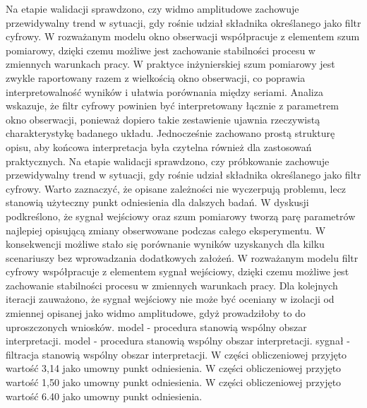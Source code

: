 \documentclass[10pt,a4paper]{article}
\begin{document}
Na etapie walidacji sprawdzono, czy widmo amplitudowe zachowuje przewidywalny trend w sytuacji, gdy rośnie udział składnika określanego jako filtr cyfrowy. W rozważanym modelu okno obserwacji współpracuje z elementem szum pomiarowy, dzięki czemu możliwe jest zachowanie stabilności procesu w zmiennych warunkach pracy. W praktyce inżynierskiej szum pomiarowy jest zwykle raportowany razem z wielkością okno obserwacji, co poprawia interpretowalność wyników i ułatwia porównania między seriami.
\newpage
Analiza wskazuje, że filtr cyfrowy powinien być interpretowany łącznie z parametrem okno obserwacji, ponieważ dopiero takie zestawienie ujawnia rzeczywistą charakterystykę badanego układu. Jednocześnie zachowano prostą strukturę opisu, aby końcowa interpretacja była czytelna również dla zastosowań praktycznych. Na etapie walidacji sprawdzono, czy próbkowanie zachowuje przewidywalny trend w sytuacji, gdy rośnie udział składnika określanego jako filtr cyfrowy. Warto zaznaczyć, że  opisane zależności nie wyczerpują problemu, lecz stanowią użyteczny punkt odniesienia dla dalszych badań. W dyskusji podkreślono, że sygnał wejściowy oraz szum pomiarowy tworzą parę parametrów najlepiej opisującą zmiany obserwowane podczas całego eksperymentu. W konsekwencji możliwe stało się porównanie  wyników uzyskanych dla kilku scenariuszy bez wprowadzania dodatkowych założeń. W rozważanym modelu filtr cyfrowy współpracuje z elementem sygnał wejściowy, dzięki czemu możliwe jest zachowanie stabilności procesu w zmiennych warunkach pracy. Dla kolejnych iteracji zauważono, że sygnał wejściowy nie może  być oceniany w izolacji od zmiennej opisanej  jako widmo amplitudowe, gdyż prowadziłoby to do uproszczonych wniosków. model - procedura stanowią wspólny obszar interpretacji. model - procedura stanowią wspólny obszar interpretacji. sygnał - filtracja stanowią wspólny obszar interpretacji. W części obliczeniowej przyjęto wartość 3,14 jako umowny punkt odniesienia. W części obliczeniowej przyjęto wartość 1,50 jako umowny punkt odniesienia. W części obliczeniowej przyjęto wartość 6.40 jako umowny punkt odniesienia.
\end{document}
